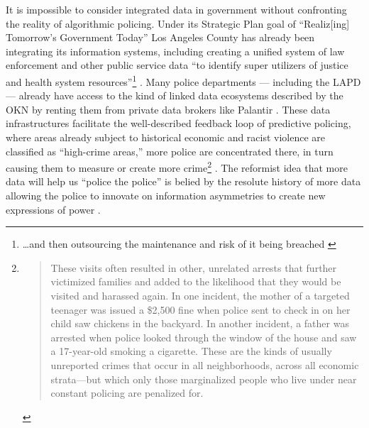 It is impossible to consider integrated data in government without
confronting the reality of algorithmic policing. Under its Strategic
Plan goal of ``Realiz{[}ing{]} Tomorrow's Government Today'' Los Angeles
County has already been integrating its information systems, including
creating a unified system of law enforcement and other public service
data ``to identify super utilizers of justice and health system
resources''\footnote{\ldots and then outsourcing the maintenance and
  risk of it being breached \cite{informationsystemsadvisoryboardcountyoflosangelesCONTRACTCOUNTYANGELES2021} } \cite{chiefexecutiveofficecountyoflosangelesStrategicPlanGoal2022, farahaniLinkingPublicSafety2016} . Many police departments ---
including the LAPD --- already have access to the kind of linked data
ecosystems described by the OKN by renting them from private data
brokers like Palantir \cite{braynePredictSurveilData2020, lamdanDefundPoliceDefund2020} . These data infrastructures facilitate
the well-described feedback loop of predictive policing, where areas
already subject to historical economic and racist violence are
classified as ``high-crime areas,'' more police are concentrated there,
in turn causing them to measure or create more crime\footnote{\begin{quote}
  These visits often resulted in other, unrelated arrests that further
  victimized families and added to the likelihood that they would be
  visited and harassed again. In one incident, the mother of a targeted
  teenager was issued a \$2,500 fine when police sent to check in on her
  child saw chickens in the backyard. In another incident, a father was
  arrested when police looked through the window of the house and saw a
  17-year-old smoking a cigarette. These are the kinds of usually
  unreported crimes that occur in all neighborhoods, across all economic
  strata---but which only those marginalized people who live under near
  constant policing are penalized for. \cite{guarigliaTechnologyCanPredict2020, kathleenTargeted2020} 
  \end{quote}} \cite{braynePredictSurveilData2020, guarigliaTechnologyCanPredict2020, stoplapdspyingcoalitionRacialTerrorWhite2021, kathleenTargeted2020, stoplapdspyingcoalitionBulletHitsBody2018, stoplapdspyingcoalitionLetter28Professors2019, castelvecchiMathematiciansUrgeColleagues2020} . The reformist idea
that more data will help us ``police the police'' is belied by the
resolute history of more data allowing the police to innovate on
information asymmetries to create new expressions of power \cite{hongPredictionExtractionDiscretion2022, stoplapdspyingcoalitionFUCKPOLICETRUST2020} .


